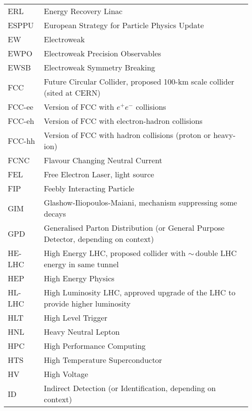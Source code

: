 \begin{tabular}{ll}
ERL     &   Energy Recovery Linac \\
ESPPU   &   European Strategy for Particle Physics Update\\
EW		&	Electroweak \\
EWPO    &   Electroweak Precision Observables \\
EWSB    &   Electroweak Symmetry Breaking \\
FCC     &   Future Circular Collider, proposed 100-km scale collider (sited at CERN) \\
FCC-ee  &   Version of FCC with $e^+e^-$ collisions \\
FCC-eh  &   Version of FCC with electron-hadron collisions \\
FCC-hh  &   Version of FCC with hadron collisions (proton or heavy-ion) \\
FCNC	&	Flavour Changing Neutral Current \\
FEL     &   Free Electron Laser, light source \\
FIP     &   Feebly Interacting Particle \\
GIM		& 	Glashow-Iliopoulos-Maiani, mechanism suppressing some decays\\
GPD     &   Generalised Parton Distribution (or General Purpose Detector, depending on context) \\
HE-LHC  &   High Energy LHC, proposed collider with $\sim$\,double LHC energy in same tunnel \\
HEP     &   High Energy Physics \\
HL-LHC  &   High Luminosity LHC, approved upgrade of the LHC to provide higher luminosity \\
HLT     &   High Level Trigger \\
HNL     &   Heavy Neutral Lepton \\
HPC     &   High Performance Computing \\
HTS     &   High Temperature Superconductor \\
HV      &   High Voltage \\
ID      &   Indirect Detection (or Identification, depending on context) \\
\end{tabular}
\newpage
